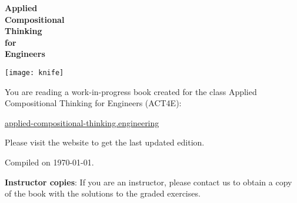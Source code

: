 \thispagestyle{empty}
\begin{center}

    \vspace{3cm}
    {\Huge\bfseries Applied\\[3mm]Compositional\\[3mm]Thinking
        \\[3mm]for\\[1mm] Engineers}%

\end{center}

\vfill
\begin{center}
    \texttt{[image: knife]}
\end{center}

\vfill
\clearpage
\vfill
You are reading a work-in-progress book created for the class Applied Compositional Thinking for Engineers (ACT4E):

\href{https://applied-compositional-thinking.engineering}{applied-compositional-thinking.engineering}

Please visit the website to get the last updated edition.

Compiled on \today.

\textbf{Instructor copies}: If you are an instructor, please contact us to obtain a copy of the book with the solutions to the graded exercises.

